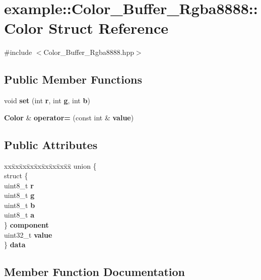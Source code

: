 \section{example\+::Color\+\_\+\+Buffer\+\_\+\+Rgba8888\+::Color Struct Reference}
\label{structexample_1_1_color___buffer___rgba8888_1_1_color}


{\ttfamily \#include $<$Color\+\_\+\+Buffer\+\_\+\+Rgba8888.\+hpp$>$}

\subsection*{Public Member Functions}
\begin{DoxyCompactItemize}
\item 
void \textbf{ set} (int \textbf{ r}, int \textbf{ g}, int \textbf{ b})
\item 
\textbf{ Color} \& \textbf{ operator=} (const int \&\textbf{ value})
\end{DoxyCompactItemize}
\subsection*{Public Attributes}
\begin{DoxyCompactItemize}
\item 
\begin{tabbing}
xx\=xx\=xx\=xx\=xx\=xx\=xx\=xx\=xx\=\kill
union \{\\
\>struct \{\\
\>\>uint8\_t \textbf{ r}\\
\>\>uint8\_t \textbf{ g}\\
\>\>uint8\_t \textbf{ b}\\
\>\>uint8\_t \textbf{ a}\\
\>\} \textbf{ component}\\
\>uint32\_t \textbf{ value}\\
\} \textbf{ data}\\

\end{tabbing}\end{DoxyCompactItemize}


\subsection{Member Function Documentation}
\mbox{\label{structexample_1_1_color___buffer___rgba8888_1_1_color_ada91a7b49ff32dc823e5cf733fc94b55}} 
